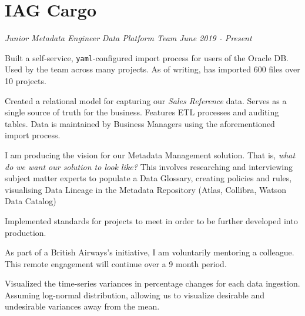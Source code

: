 \documentclass[../cv.tex]{subfiles}
\begin{document}
\section{IAG Cargo}
\textit{Junior Metadata Engineer}
\hfill
\textit{Data Platform Team}
\hfill
\textit{June 2019 - Present}
\begin{description}[style=multiline, leftmargin=3.5cm]
	\item[Self-Service Import Process\\\textnormal{Python, Powershell}]
		Built a self-service, \texttt{yaml}-configured import process for users of the Oracle DB. Used by the team across many projects. As of writing, has imported 600 files over 10 projects. \\
	\item[Sales Schema \textnormal{Oracle}] Created a relational model for capturing our \textit{Sales Reference} data. Serves as a single source of truth for the business. Features ETL processes and auditing tables. Data is maintained by Business Managers using the aforementioned import process.
	\item[Metadata Management] I am producing the vision for our Metadata Management solution. That is, \textit{what do we want our solution to look like?} This involves researching and interviewing subject matter experts to populate a Data Glossary, creating policies and rules, visualising  Data Lineage in the Metadata Repository (Atlas, Collibra, Watson Data Catalog)
	\item[Data Standards] Implemented standards for projects to meet in order to be further developed into production. 
	\item[Mentoring \textnormal{moving-ahead.org}] As part of a British Airways's initiative, I am voluntarily mentoring a colleague. This remote engagement will continue over a 9 month period.
	\item[Vizualizations\\\textnormal{Tableau}] Visualized the time-series variances in percentage changes for each data ingestion. Assuming log-normal distribution, allowing us to visualize desirable and undesirable variances away from the mean.\\\
\end{description}
\end{document}
